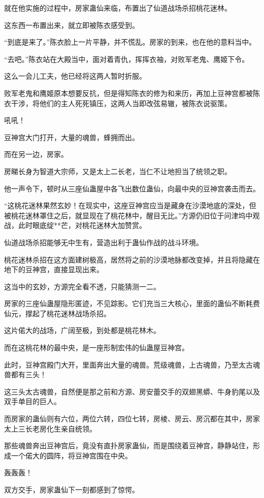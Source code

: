 \begin{this_body}
就在他实施的过程中，房家蛊仙来临，布置出了仙道战场杀招桃花迷林。

这东西一布置出来，就立即被陈衣感受到。

“到底是来了。”陈衣脸上一片平静，并不慌乱。房家的到来，也在他的意料当中。

“去吧。”陈衣站在大殿当中，面对着青仇，挥挥衣袖，对败军老鬼、鹰姬下令。

这么一会儿工夫，他已经将这两人暂时折服。

败军老鬼和鹰姬原本想要反抗，但是得知陈衣的修为和来历，再加上豆神宫都被陈衣干涉，将他们的主人死死镇压，这两人当即改弦易辙，被陈衣说驱策。

吼吼！

豆神宫大门打开，大量的魂兽，蜂拥而出。

而在另一边，房家。

房睇长身为智道大宗师，又是太上二长老，当仁不让地担当了统领之职。

他一声令下，顿时从三座仙蛊屋中各飞出数位蛊仙，向最中央的豆神宫袭击而去。

“这桃花迷林果然玄妙！在现实中，这座豆神宫应当是藏身在沙漠地底的深处，但被桃花迷林罩住之后，就显现在了桃花林中，醒目无比。”方源仍旧位于问津坞中观战，此时眼底绽**芒，对桃花迷林大加赞赏。

仙道战场杀招能够无中生有，营造出利于蛊仙作战的战斗环境。

桃花迷林杀招在这方面建树极高，居然将之前的沙漠地脉都改变掉，并且将隐藏在地下的豆神宫，直接显现出来。

这当中的玄妙，方源完全看不透，只能猜测一二。

房家的三座仙蛊屋隐形匿迹，不见踪影。它们充当三大核心，里面的蛊仙不断耗费仙元，撑起了桃花迷林战场杀招。

这片偌大的战场，广阔至极，到处都是桃花林木。

而在这桃花林的最中央，是一座形制宏伟的仙蛊屋豆神宫。

此时，豆神宫殿门大开，里面奔出大量的魂兽。荒级魂兽，上古魂兽，乃至太古魂兽都有三头！

这三头太古魂兽，自然便是那之前和方源、房安蕾交手的双翅黑蟒、牛身豹尾以及双手单目的巨人。

而房家的蛊仙则有六位，两位六转，四位七转，房棱、房云、房沉都在其中，房家太上三长老房化生亲自统领。

那些魂兽奔出豆神宫后，竟没有直扑房家蛊仙，而是围绕着豆神宫，静静站住，形成一个偌大的圆阵，将豆神宫围在中央。

轰轰轰！

双方交手，房家蛊仙下一刻都感到了惊愕。


\end{this_body}
